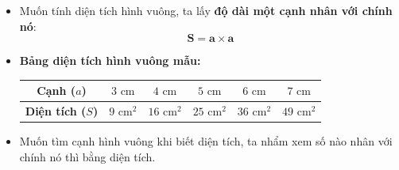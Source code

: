 \documentclass[11pt,a4paper]{article}
\begin{document}
\begin{minipage}[t]{0.49\textwidth}\vspace{0pt}
\begin{tcolorbox}[
  enhanced,
  colback=teal!4!white,
  colframe=teal!75!black,
  arc=2mm, boxrule=0.8pt,
  left=2mm, right=2mm, top=1.8mm, bottom=1.8mm,
  title={\footnotesize\bfseries\color{white}\faCheckSquare\ 2. Diện tích hình vuông}
]
{\footnotesize
\begin{itemize}\setlength{\itemsep}{1.5pt}\setlength{\leftskip}{-2.5mm}
  \item Muốn tính diện tích hình vuông, ta lấy \textbf{độ dài một cạnh nhân với chính nó}:
  $$\mathbf{S = a \times a}$$
  \item \textbf{Bảng diện tích hình vuông mẫu:}
  \begin{center}
  \renewcommand{\arraystretch}{1.1}
  \begin{tabular}{|c|c|c|c|c|c|}
    \hline
    \textbf{Cạnh ($a$)} & $3\text{ cm}$ & $4\text{ cm}$ & $5\text{ cm}$ & $6\text{ cm}$ & $7\text{ cm}$ \\
    \hline
    \textbf{Diện tích ($S$)} & $9\text{ cm}^2$ & $16\text{ cm}^2$ & $25\text{ cm}^2$ & $36\text{ cm}^2$ & $49\text{ cm}^2$ \\
    \hline
  \end{tabular}
  \end{center}
  \item Muốn tìm cạnh hình vuông khi biết diện tích, ta nhẩm xem số nào nhân với chính nó thì bằng diện tích.
\end{itemize}
}
\end{tcolorbox}
\end{minipage}
\end{document}
